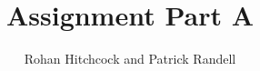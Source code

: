 \documentclass[11pt]{article}
\begin{document}
    \title{\textbf{Assignment Part A}}
    \author{Rohan Hitchcock and Patrick Randell}
    \date{}
    \maketitle

    \Blindtext
\end{document}
